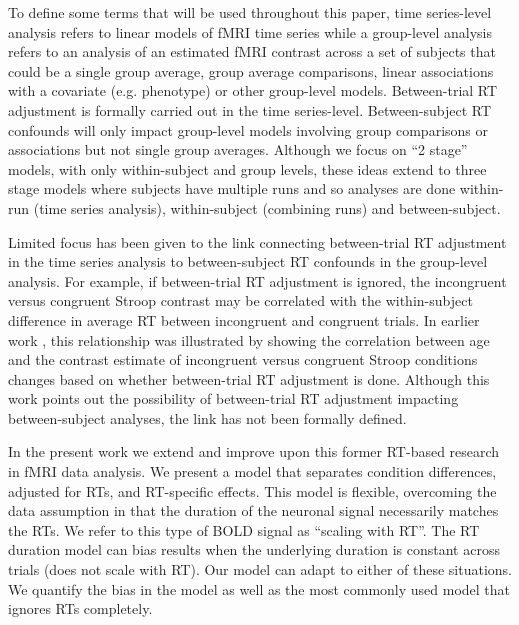 \documentclass[titlepage,12pt] {article}
\begin{document}
To define some terms that will be used throughout this paper, time series-level analysis refers to linear models of fMRI time series while a group-level analysis refers to an analysis of an estimated fMRI contrast across a set of subjects that could be a single group average, group average comparisons, linear associations with a covariate (e.g. phenotype) or other group-level models.   Between-trial RT adjustment is formally carried out in the time series-level. Between-subject RT confounds will only impact group-level models involving group comparisons or associations but not single group averages.  Although we focus on ``2 stage'' models, with only within-subject and group levels, these ideas extend to three stage models where subjects have multiple runs and so analyses are done within-run (time series analysis), within-subject (combining runs) and between-subject.


Limited focus has been given to the link connecting between-trial RT adjustment in the time series analysis to between-subject RT confounds in the group-level analysis. For example, if between-trial RT adjustment is ignored, the incongruent versus congruent Stroop contrast may be  correlated with the within-subject difference in average RT between incongruent and congruent trials.  In earlier work \citep{carpRemovingEffectResponse2012}, this relationship was illustrated by showing the correlation between age and the contrast estimate of incongruent versus congruent Stroop conditions changes based on whether between-trial RT adjustment is done. Although this work points out the possibility of between-trial RT adjustment impacting between-subject analyses, the link has not been formally defined.
 
In the present work we extend and improve upon this former RT-based research in fMRI data analysis.   We present a model that separates condition differences, adjusted for RTs, and RT-specific effects.  This model is flexible, overcoming the data assumption in \citet{grinband_detection_2008} that the duration of the neuronal signal necessarily matches the RTs.  We refer to this type of BOLD signal as ``scaling with RT''.  The RT duration model can bias results when the underlying duration is constant across trials (does not scale with RT).  Our model can adapt to either of these situations.  We quantify the bias in the \citet{grinband_detection_2008} model as well as the most commonly used model that ignores RTs completely.  
\end{document}
